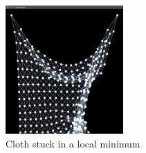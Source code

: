 \documentclass[a4paper,twoside,11pt,twocolumn]{article}
\begin{document}
\begin{figure}[h]
	\includegraphics[width=0.4\textwidth]{diag_localmin}
	\caption{Cloth stuck in a local minimum}
	\label{diag_localmin}
\end{figure}
\end{document}
